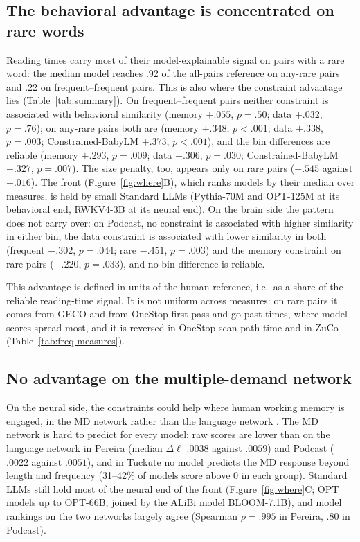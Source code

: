\subsection{The behavioral advantage is concentrated on rare words}
\label{sec:results-freq}

Reading times carry most of their model-explainable signal on pairs with a rare word: the median model reaches .92 of the all-pairs reference on any-rare pairs and .22 on frequent--frequent pairs. This is also where the constraint advantage lies (Table~\ref{tab:summary}). On frequent--frequent pairs neither constraint is associated with behavioral similarity (memory $+.055$, $p=.50$; data $+.032$, $p=.76$); on any-rare pairs both are (memory $+.348$, $p<.001$; data $+.338$, $p=.003$; Constrained-BabyLM $+.373$, $p<.001$), and the bin differences are reliable (memory $+.293$, $p=.009$; data $+.306$, $p=.030$; Constrained-BabyLM $+.327$, $p=.007$). The size penalty, too, appears only on rare pairs ($-.545$ against $-.016$). The front (Figure~\ref{fig:where}B), which ranks models by their median over measures, is held by small Standard LLMs (Pythia-70M and OPT-125M at its behavioral end, RWKV4-3B at its neural end). On the brain side the pattern does not carry over: on Podcast, no constraint is associated with higher similarity in either bin, the data constraint is associated with lower similarity in both (frequent $-.302$, $p=.044$; rare $-.451$, $p=.003$) and the memory constraint on rare pairs ($-.220$, $p=.033$), and no bin difference is reliable.

This advantage is defined in units of the human reference, i.e.\ as a share of the reliable reading-time signal. It is not uniform across measures: on rare pairs it comes from GECO and from OneStop first-pass and go-past times, where model scores spread most, and it is reversed in OneStop scan-path time and in ZuCo (Table~\ref{tab:freq-measures}).

\subsection{No advantage on the multiple-demand network}
\label{sec:results-md}

On the neural side, the constraints could help where human working memory is engaged, in the MD network rather than the language network \citep{duncan2010multiple,fedorenko2013broad}. The MD network is hard to predict for every model: raw scores are lower than on the language network in Pereira (median $\Delta\ell$ $.0038$ against $.0059$) and Podcast ($.0022$ against $.0051$), and in Tuckute no model predicts the MD response beyond length and frequency (31--42\% of models score above 0 in each group). Standard LLMs still hold most of the neural end of the front (Figure~\ref{fig:where}C; OPT models up to OPT-66B, joined by the ALiBi model BLOOM-7.1B), and model rankings on the two networks largely agree (Spearman $\rho=.995$ in Pereira, $.80$ in Podcast).

